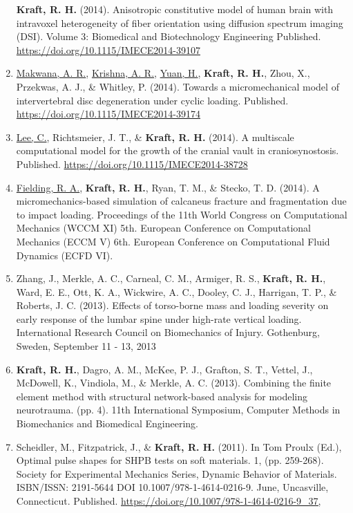 \documentclass[a4paper,10pt]{article}
\begin{document}
\begin{enumerate}
 \textbf{\textbf{Kraft,} R. H.} (2014). Anisotropic constitutive model of human brain with intravoxel heterogeneity of fiber orientation using diffusion spectrum imaging (DSI). Volume 3: Biomedical and Biotechnology Engineering Published. \url{https://doi.org/10.1115/IMECE2014-39107}
  \item \underline{Makwana, A. R.}, \underline{Krishna, A. R.}, \underline{Yuan, H.}, \textbf{\textbf{Kraft,} R. H.}, Zhou, X., Przekwas, A. J., \&
 Whitley, P. (2014). Towards a micromechanical model of intervertebral disc degeneration under cyclic loading. Published. \url{https://doi.org/10.1115/IMECE2014-39174}
  \item \underline{Lee, C.}, Richtsmeier, J. T., \&
 \textbf{\textbf{Kraft,} R. H.} (2014). A multiscale computational model for the growth of the cranial vault in craniosynostosis. Published. \url{https://doi.org/10.1115/IMECE2014-38728}
  \item \underline{Fielding, R. A.}, \textbf{\textbf{Kraft,} R. H.}, Ryan, T. M., \&
 Stecko, T. D. (2014). A micromechanics-based simulation of calcaneus fracture and fragmentation due to impact loading. Proceedings of the 11th World Congress on Computational Mechanics (WCCM XI) 5th. European Conference on Computational Mechanics (ECCM V)    6th. European Conference on Computational Fluid Dynamics (ECFD VI).
  \item Zhang, J., Merkle, A. C., Carneal, C. M., Armiger, R. S., \textbf{\textbf{Kraft,} R. H.}, Ward, E. E., Ott, K. A., Wickwire, A. C., Dooley, C. J., Harrigan, T. P., \&
 Roberts, J. C. (2013). Effects of torso-borne mass and loading severity on early response of the lumbar spine under high-rate vertical loading. International Research Council on Biomechanics of Injury.    
Gothenburg, Sweden, September 11 - 13,    2013
  \item \textbf{\textbf{Kraft,} R. H.}, Dagro, A. M., McKee, P. J., Grafton, S. T., Vettel, J., McDowell, K., Vindiola, M., \&
 Merkle, A. C. (2013). Combining the finite element method with structural network-based analysis for modeling neurotrauma. (pp. 4). 11th International Symposium, Computer Methods in Biomechanics and Biomedical Engineering.
  \item Scheidler, M., Fitzpatrick, J., \&
 \textbf{\textbf{Kraft,} R. H.} (2011). In Tom Proulx (Ed.), Optimal pulse shapes for SHPB tests on soft materials. 1, (pp. 259-268). Society for Experimental Mechanics Series, Dynamic Behavior of Materials.  ISBN/ISSN: 2191-5644 
DOI 10.1007/978-1-4614-0216-9. June, Uncasville, Connecticut. Published. \url{https://doi.org/10.1007/978-1-4614-0216-9_37,}

\end{enumerate}
\end{document}
